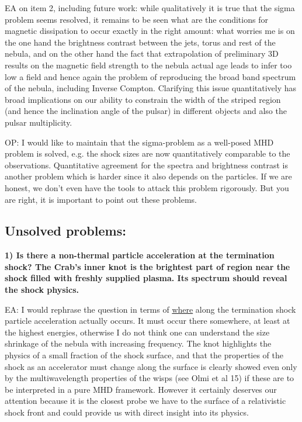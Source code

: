 EA on item 2, including future work: while qualitatively it is true that the sigma problem seems resolved, it remains to be seen what are the conditions for magnetic dissipation to occur exactly in the right amount: what worries me is on the one hand the brightness contrast between the jets, torus and rest of the nebula, and on the other hand the fact that extrapolation of preliminary 3D results on the magnetic field strength to the nebula actual age leads to infer too low a field and hence again the problem of reproducing the broad band spectrum of the nebula, including Inverse Compton.
Clarifying this issue quantitatively has broad implications on our ability to constrain the width of the striped region (and hence the inclination angle of the pulsar) in different objects and also the pulsar multiplicity. 

OP: I would like to maintain that the sigma-problem as a well-posed MHD problem is solved, e.g. the shock sizes are now quantitatively comparable to the observations.  Quantitative agreement for the spectra and brightness contrast is another problem which is harder since it also depends on the particles.  If we are honest, we don't even have the tools to attack this problem rigorously.  But you are right, it is important to point out these problems.  


\subsection{Unsolved problems:}

\textbf{1) Is there a non-thermal particle acceleration at the termination shock? The Crab's inner knot is the brightest part of region near the shock filled with freshly supplied plasma. Its spectrum should reveal the shock physics. }

EA: I would rephrase the question in terms of \underline{where} along the termination shock particle acceleration actually occurs. It must occur there somewhere, at least at the highest energies, otherwise I do not think one can understand the size shrinkage of the nebula with increasing frequency. 
The knot highlights the physics of a small fraction of the shock surface, and that the properties of the shock as an accelerator must change along the surface is clearly showed even only by the multiwavelength properties of the wisps (see Olmi et al 15) if these are to be interpreted in a pure MHD framework. However it certainly deserves our attention because it is the closest probe we have to the surface of a relativistic shock front and could provide us with direct insight into its physics. 


